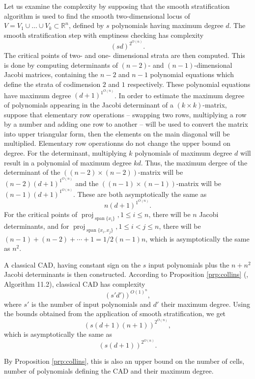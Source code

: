 \documentclass[
]{book}
\theoremstyle{definition}
\theoremstyle{definition}
\theoremstyle{definition}
\theoremstyle{definition}
\theoremstyle{remark}
\begin{document}
Let us examine the complexity by supposing that the smooth stratification algorithm is used to find the smooth two-dimensional locus of \(V = V_1\cup \ldots \cup V_k \subset \mathbb{R}^n\), defined by \(s\) polynomials having maximum degree \(d\).
The smooth stratification step with emptiness checking has complexity
\[
(sd)^{2^{O(n)}}.
\]
The critical points of two- and one- dimensional strata are then computed. This is done by computing determinants of \((n-2)\)- and \((n-1)\)-dimensional Jacobi matrices, containing the \(n-2\) and \(n-1\) polynomial equations which define the strata of codimension \(2\) and \(1\) respectively. These polynomial equations have maximum degree \((d + 1)^{1^{O(n)}}\).
In order to estimate the maximum degree of polynomials appearing in the Jacobi determinant of a \((k \times k)\)-matrix, suppose that elementary row operations -- swapping two rows, multiplying a row by a number and adding one row to another -- will be used to convert the matrix into upper triangular form, then the elements on the main diagonal will be multiplied.
Elementary row operationns do not change the upper bound on degree. For the determinant, multiplying \(k\) polynomials of maximum degree \(d\) will result in a polynomial of maximum degree \(kd\). Thus, the maximum dergee of the determinant of the \(((n-2)\times (n-2))\)-matrix will be \((n-2)(d + 1)^{1^{O(n)}}\) and the \(((n-1) \times (n-1))\)-matrix will be \((n-1)(d + 1)^{1^{O(n)}}\). These are both asymptotically the same as
\[
n (d + 1)^{1^{O(n)}}.
\]
For the critical points of \({\operatorname{proj}_{{\operatorname{span} \{x_i\}}}}, 1 \le i \le n\), there will be \(n\) Jacobi determinants, and for \({\operatorname{proj}_{{\operatorname{span} \{x_i,x_j\}}}}, 1 \le i < j \le n\), there will be \((n-1) + (n-2) + \cdots + 1 = 1/2 (n-1)n\), which is asymptotically the same as \(n^2\).

A classical CAD, having constant sign on the \(s\) input polynomials plus the \(n + n^2\) Jacobi determinants is then constructed.
According to Proposition \ref{prp:collins} (\citet{bpr2006}, Algorithm 11.2), classical CAD has complexity
\[
\left(s'd')\right)^{O(1)^{n}},
\]
where \(s'\) is the number of input polynomials and \(d'\) their maximum degree. Using the bounds obtained from the application of smooth stratification, we get
\[
\left(s\left(d+1\right)\left(n+1\right)\right)^{2^{O(n)}},
\]
which is asymptotically the same as
\[
\left(s\left(d+1\right)\right)^{2^{O(n)}}.
\]

By Proposition \ref{prp:collins}, this is also an upper bound on the number of cells, number of polynomials defining the CAD and their maximum degree.
\end{document}
